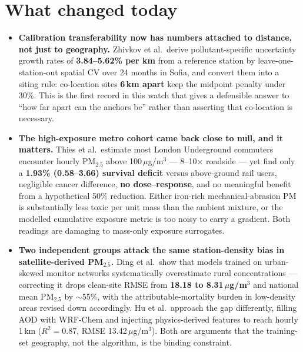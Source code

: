 \documentclass[10pt]{article}
\begin{document}
\vspace{3mm}

\section*{\sffamily\bfseries\color{Deep}What changed today}
\vspace{-1.5mm}{\color{Amber}\rule{\linewidth}{1.1pt}}\vspace{2.5mm}

\footnotesize
\begin{itemize}
\item \textbf{Calibration transferability now has numbers attached to distance, not just
to geography.} Zhivkov et al.\ derive pollutant-specific uncertainty growth rates of
\textbf{3.84--5.62\% per km} from a reference station by leave-one-station-out spatial
CV over 24 months in Sofia, and convert them into a siting rule: co-location sites
\textbf{6\,km apart} keep the midpoint penalty under 30\%. This is the first record in
this watch that gives a defensible answer to ``how far apart can the anchors be'' rather
than asserting that co-location is necessary.

\item \textbf{The high-exposure metro cohort came back close to null, and it matters.}
Thies et al.\ estimate most London Underground commuters encounter hourly PM$_{2.5}$
above 100\,$\mu$g/m$^3$ --- 8--10$\times$ roadside --- yet find only a
\textbf{1.93\% (0.58--3.66) survival deficit} versus above-ground rail users, negligible
cancer difference, \textbf{no dose--response}, and no meaningful benefit from a
hypothetical 50\% reduction. Either iron-rich mechanical-abrasion PM is substantially
less toxic per unit mass than the ambient mixture, or the modelled cumulative exposure
metric is too noisy to carry a gradient. Both readings are damaging to mass-only
exposure surrogates.

\item \textbf{Two independent groups attack the same station-density bias in
satellite-derived PM$_{2.5}$.} Ding et al.\ show that models trained on urban-skewed
monitor networks systematically overestimate rural concentrations --- correcting it drops
clean-site RMSE from \textbf{18.18 to 8.31\,$\mu$g/m$^3$} and national mean PM$_{2.5}$ by
$\sim$55\%, with the attributable-mortality burden in low-density areas revised down
accordingly. Hu et al.\ approach the gap differently, filling AOD with WRF-Chem and
injecting physics-derived features to reach hourly 1\,km ($R^2 = 0.87$,
RMSE 13.42\,$\mu$g/m$^3$). Both are arguments that the training-set geography, not the
algorithm, is the binding constraint.


\end{itemize}
\end{document}
